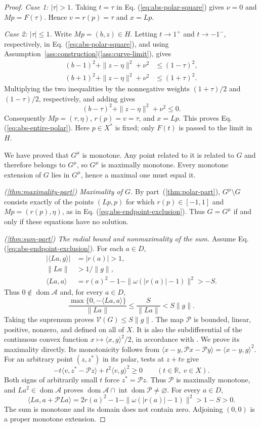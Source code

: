 \documentclass[11pt]{article}
\newcommand{\R}{\mathbb R}
\newcommand{\dom}{\operatorname{dom}}
\newcommand{\pair}[2]{\langle #1,#2\rangle}
\theoremstyle{definition}
\theoremstyle{remark}
\begin{document}
\begin{proof}
\emph{Case 1: $|\tau|>1$.} Taking $t=\tau$ in Eq. (\ref{eq:abs-polar-square}) gives $\nu=0$ and $Mp=F(\tau)$. Hence $v=r(p)=\tau$ and $x=Lp$.

\emph{Case 2: $|\tau|\le1$.} Write $Mp=(b,z)\in H$. Letting $t\to1^+$ and $t\to-1^-$, respectively, in Eq. (\ref{eq:abs-polar-square}), and using Assumption~\ref{ass:construction}\textup{(\ref{ass:curve-limit})}, gives
\[
\begin{aligned}
(b-1)^2+\|z-\eta\|^2+\nu^2&\le(1-\tau)^2,\\
(b+1)^2+\|z-\eta\|^2+\nu^2&\le(1+\tau)^2.
\end{aligned}
\]
Multiplying the two inequalities by the nonnegative weights $(1+\tau)/2$ and $(1-\tau)/2$, respectively, and adding gives
\[
(b-\tau)^2+\|z-\eta\|^2+\nu^2\le0.
\]
Consequently $Mp=(\tau,\eta)$, $r(p)=v=\tau$, and $x=Lp$. This proves Eq. (\ref{eq:abs-entire-polar}). Here $p\in X^*$ is fixed; only $F(t)$ is passed to the limit in $H$.

We have proved that $G^\mu$ is monotone. Any point related to it is related to $G$ and therefore belongs to $G^\mu$, so $G^\mu$ is maximally monotone. Every monotone extension of $G$ lies in $G^\mu$, hence a maximal one must equal it.

\noindent\textit{\textup{(\ref{thm:maximality-part})} Maximality of $G$.}
By part~\textup{(\ref{thm:polar-part})}, $G^\mu\setminus G$ consists exactly of the points $(Lp,p)$ for which $r(p)\in[-1,1]$ and $Mp=(r(p),\eta)$, as in Eq. (\ref{eq:abs-endpoint-exclusion}). Thus $G=G^\mu$ if and only if these equations have no solution.

\noindent\textit{\textup{(\ref{thm:sum-part})} The radial bound and nonmaximality of the sum.}
Assume Eq. (\ref{eq:abs-endpoint-exclusion}). For each $a\in D$,
\[
\begin{aligned}
|\pair{La}{g}|&=|r(a)|>1,\\
\|La\|&>1/\|g\|,\\
\pair{La}{a}&=r(a)^2-1-\|\omega(|r(a)|-1)\|^2>-S.
\end{aligned}
\]
Thus $0\notin\dom\mathcal A$ and, for every $a\in D$,
\[
\frac{\max\{0,-\pair{La}{a}\}}{\|La\|}
\le\frac{S}{\|La\|}<S\|g\|.
\]
Taking the supremum proves $\mathcal V(G)\le S\|g\|$. The map $\mathcal P$ is bounded, linear, positive, nonzero, and defined on all of $X$. It is also the subdifferential of the continuous convex function $x\mapsto\pair{x}{g}^2/2$, in accordance with \cite{rockafellar1970subdiff}. We prove its maximality directly. Its monotonicity follows from $\pair{x-y}{\mathcal Px-\mathcal Py}=\pair{x-y}{g}^2$. For an arbitrary point $(z,z^*)$ in its polar, tests at $z+tv$ give
\[
-t\pair{v}{z^*-\mathcal Pz}+t^2\pair{v}{g}^2\ge0
\qquad(t\in\R,\ v\in X).
\]
Both signs of arbitrarily small $t$ force $z^*=\mathcal Pz$. Thus $\mathcal P$ is maximally monotone, and $La^2\in\dom\mathcal A$ proves $\dom\mathcal A\cap\operatorname{int}\dom\mathcal P\ne\varnothing$. For every $a\in D$,
\[
\pair{La}{a+\mathcal PLa}
=2r(a)^2-1-\|\omega(|r(a)|-1)\|^2>1-S>0.
\]
The sum is monotone and its domain does not contain zero. Adjoining $(0,0)$ is a proper monotone extension.
\end{proof}
\end{document}
